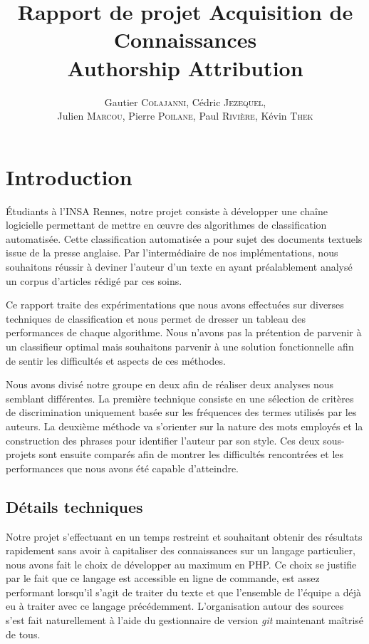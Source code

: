\documentclass[a4paper,12pt]{report}
\author{Gautier \textsc{Colajanni}, Cédric \textsc{Jezequel},\\ Julien \textsc{Marcou}, Pierre \textsc{Poilane}, Paul \textsc{Rivière}, Kévin \textsc{Thek}}
\title{Rapport de projet Acquisition de Connaissances \\ Authorship Attribution}
\begin{document}


\newpage \thispagestyle{empty}
\null
\newpage 

\renewcommand\contentsname{Sommaire}
\tableofcontents


\section*{Introduction}

Étudiants à l'INSA Rennes, notre projet consiste à développer une chaîne logicielle permettant de mettre en œuvre des algorithmes de classification automatisée. Cette classification automatisée a pour sujet des documents textuels issue de la presse anglaise. Par l'intermédiaire de nos implémentations, nous souhaitons réussir à deviner l'auteur d'un texte en ayant préalablement analysé un corpus d'articles rédigé par ces soins.

Ce rapport traite des expérimentations que nous avons effectuées sur diverses techniques de classification et nous permet de dresser un tableau des performances de chaque algorithme. Nous n'avons pas la prétention de parvenir à un classifieur optimal mais souhaitons parvenir à une solution fonctionnelle afin de sentir les difficultés et aspects de ces méthodes.

Nous avons divisé notre groupe en deux afin de réaliser deux analyses nous semblant différentes. La première technique consiste en une sélection de critères de discrimination uniquement basée sur les fréquences des termes utilisés par les auteurs. La deuxième méthode va s'orienter sur la nature des mots employés et la construction des phrases pour identifier l'auteur par son style. Ces deux sous-projets sont ensuite comparés afin de montrer les difficultés rencontrées et les performances que nous avons été capable d'atteindre.

\subsection*{Détails techniques}

Notre projet s'effectuant en un temps restreint et souhaitant obtenir des résultats rapidement sans avoir à capitaliser des connaissances sur un langage particulier, nous avons fait le choix de développer au maximum en PHP. Ce choix se justifie par le fait que ce langage est accessible en ligne de commande, est assez performant lorsqu'il s'agit de traiter du texte et que l'ensemble de l'équipe a déjà eu à traiter avec ce langage précédemment. 
L'organisation autour des sources s'est fait naturellement à l'aide du gestionnaire de version \textit{git} maintenant maîtrisé de tous.
\end{document}
